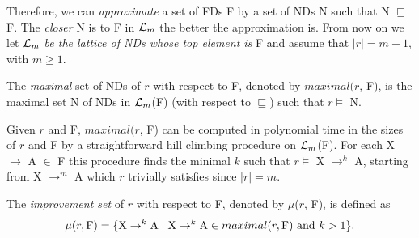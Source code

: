 Therefore, we can {\em approximate} a set of FDs F by a set of NDs N
such that N $\sqsubseteq$ F. 
The {\em closer} N is to F in ${\cal L}_m$ the better the approximation is.
From now on we let ${\cal L}_m$ 
{\em be the lattice of NDs whose top element is} F
and assume that $\mid r \mid = m+1$, with $m \ge 1$.

\medskip

\begin{definition}
\begin{rm}
The {\em maximal} set of NDs of $r$ with respect to F,
denoted by $maximal(r$, F), is the maximal set N of NDs
in ${\cal L}_m$(F) (with respect to $\sqsubseteq$) such that $r \models$ N.
\end{rm}
\end{definition}
\medskip

Given $r$ and F, $maximal(r$, F) can be computed in polynomial time in the
sizes of $r$ and F by a straightforward hill climbing procedure
on ${\cal L}_m$(F). For each X $\to$ A $\in$ F this procedure finds 
the minimal $k$ such that $r \models$ X $\to^k$ A, starting 
from X $\to^m$ A which $r$ trivially satisfies since $\mid r \mid = m$. 


\begin{definition}
\begin{rm}
The {\em improvement set} of $r$ with respect to F, 
denoted by $\mu$($r$, F), is defined as 
\begin{displaymath}
\mu(r, {\rm F}) = \{{\rm X} \to^k {\rm A} \mid 
{\rm X} \to^k {\rm A} \in maximal(r, {\rm F}) \mbox{ and }  k > 1\}.
\end{displaymath}
\end{rm}
\end{definition}
\medskip


